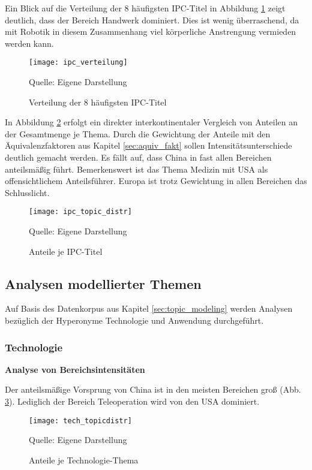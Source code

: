 Ein Blick auf die Verteilung der 8 häufigsten \ac{IPC}-Titel in Abbildung \ref{fig:ipc_verteilung} zeigt deutlich, dass der Bereich Handwerk dominiert. Dies ist wenig überraschend, da mit Robotik in diesem Zusammenhang viel körperliche Anstrengung vermieden werden kann.
\begin{figure}[H]
	\caption{Verteilung der 8 häufigsten \Ac{IPC}-Titel}
	\texttt{[image: ipc\_verteilung]}
	\label{fig:ipc_verteilung}
		\vspace{0.5em}
	\raggedright
	\normalsize{Quelle: Eigene Darstellung}
	\vspace{-2.0em}
\end{figure}
In Abbildung \ref{fig:ipc_topic_distr} erfolgt ein direkter interkontinentaler Vergleich von Anteilen an der Gesamtmenge je Thema. Durch die Gewichtung der Anteile mit den Äquivalenzfaktoren aus Kapitel \ref{sec:aquiv_fakt} sollen Intensitätsunterschiede deutlich gemacht werden. Es fällt auf, dass China in fast allen Bereichen anteilsmäßig führt. Bemerkenswert ist das Thema Medizin mit USA als offensichtlichem Anteilsführer. Europa ist trotz Gewichtung in allen Bereichen das Schlusslicht. 
\begin{figure}[H]
	\caption{Anteile je IPC-Titel}
	\texttt{[image: ipc\_topic\_distr]}
	\label{fig:ipc_topic_distr}
	\vspace{0.5em}
	\raggedright
	\normalsize{Quelle: Eigene Darstellung}
	\vspace{-2.0em}
\end{figure}

\subsection{Analysen modellierter Themen}

Auf Basis des Datenkorpus aus Kapitel \ref{sec:topic_modeling} werden Analysen bezüglich der Hyperonyme Technologie und Anwendung durchgeführt.

\subsubsection{Technologie}

\textbf{Analyse von Bereichsintensitäten}

Der anteilsmäßige Vorsprung von China ist in den meisten Bereichen groß (Abb. \ref{fig:tech_topicdistr}). Lediglich der Bereich Teleoperation wird von den USA dominiert.
\begin{figure}[H]
	\caption{Anteile je Technologie-Thema}
	\texttt{[image: tech\_topicdistr]}
	\label{fig:tech_topicdistr}
	\vspace{0.5em}
	\raggedright
	\normalsize{Quelle: Eigene Darstellung}
	\vspace{-2.0em}
\end{figure}

